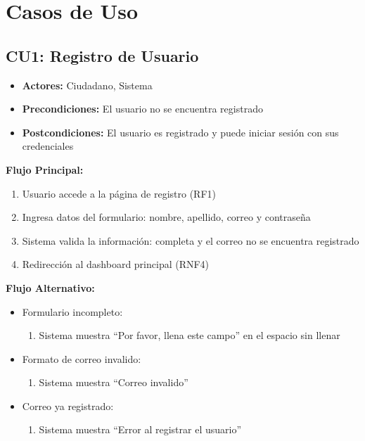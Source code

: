 \section{Casos de Uso}

\begin{multicols}{2}

\subsection*{CU1: Registro de Usuario}
\begin{itemize}
    \item \textbf{Actores:} Ciudadano, Sistema
    \item \textbf{Precondiciones:} El usuario no se encuentra registrado
    \item \textbf{Postcondiciones:} El usuario es registrado y puede iniciar sesión con sus credenciales
\end{itemize}
\textbf{Flujo Principal:}
\begin{enumerate}
    \item Usuario accede a la página de registro (RF1)
    \item Ingresa datos del formulario: nombre, apellido, correo y contraseña
    \item Sistema valida la información: completa y el correo no se encuentra registrado 
    \item Redirección al dashboard principal (RNF4)
\end{enumerate}

\textbf{Flujo Alternativo:}
\begin{itemize}
    \item Formulario incompleto:
    \begin{enumerate}
        \item Sistema muestra ``Por favor, llena este campo'' en el espacio sin llenar
    \end{enumerate}
    \item Formato de correo invalido:
    \begin{enumerate}
        \item Sistema muestra ``Correo invalido''
    \end{enumerate}
    \item Correo ya registrado:
    \begin{enumerate}
        \item Sistema muestra ``Error al registrar el usuario''
    \end{enumerate}
\end{itemize}


\end{multicols}
